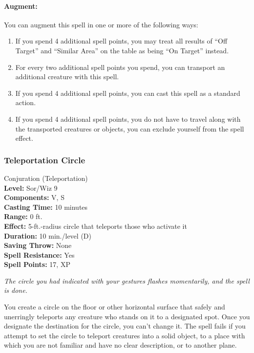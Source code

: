 \paragraph{Augment:} You can augment this spell in one or more of the following ways:
\begin{enumerate}
 \item If you spend 4 additional spell points, you may treat all results of ``Off Target'' and ``Similar Area'' on the  table as being ``On Target'' instead.
 \item For every two additional spell points you spend, you can transport an additional creature with this spell. %
 \item If you spend 4 additional spell points, you can cast this spell as a standard action.
 \item If you spend 4 additional spell points, you do not have to travel along with the transported creatures or objects, you can exclude yourself from the spell effect.
\end{enumerate}
\subsubsection{Teleportation Circle}
\label{Spell:TeleportationCircle}
Conjuration (Teleportation)
\\ \textbf{Level:} Sor/Wiz 9
\\ \textbf{Components:} V, S
\\ \textbf{Casting Time:} 10 minutes
\\ \textbf{Range:} 0 ft.
\\ \textbf{Effect:} 5-ft.-radius circle that teleports those who activate it
\\ \textbf{Duration:} 10 min./level (D)
\\ \textbf{Saving Throw:} None
\\ \textbf{Spell Resistance:} Yes
\\ \textbf{Spell Points:} 17, XP

\emph{The circle you had indicated with your gestures flashes momentarily, and the spell is done.}

You create a circle on the floor or other horizontal surface that safely and unerringly teleports any creature who stands on it to a designated spot. 
Once you designate the destination for the circle, you can't change it. 
The spell fails if you attempt to set the circle to teleport creatures into a solid object, 
to a place with which you are not familiar and have no clear description, or to another plane.

